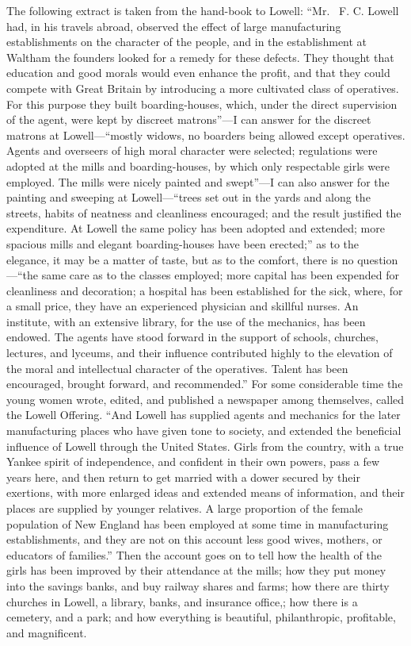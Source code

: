 The following extract is taken from the hand-book to Lowell: ``Mr.\ %
F. C. Lowell had, in his travels abroad, observed the effect of
large manufacturing establishments on the character of the people,
and in the establishment at Waltham the founders looked for a
remedy for these defects.  They thought that education and good
morals would even enhance the profit, and that they could compete
with Great Britain by introducing a more cultivated class of
operatives.  For this purpose they built boarding-houses, which,
under the direct supervision of the agent, were kept by discreet
matrons''---I can answer for the discreet matrons at Lowell---``mostly
widows, no boarders being allowed except operatives.  Agents and
overseers of high moral character were selected; regulations were
adopted at the mills and boarding-houses, by which only respectable
girls were employed.  The mills were nicely painted and swept''---I
can also answer for the painting and sweeping at Lowell---``trees set
out in the yards and along the streets, habits of neatness and
cleanliness encouraged; and the result justified the expenditure.
At Lowell the same policy has been adopted and extended; more
spacious mills and elegant boarding-houses have been erected;'' as
to the elegance, it may be a matter of taste, but as to the
comfort, there is no question---``the same care as to the classes
employed; more capital has been expended for cleanliness and
decoration; a hospital has been established for the sick, where,
for a small price, they have an experienced physician and skillful
nurses.  An institute, with an extensive library, for the use of
the mechanics, has been endowed.  The agents have stood forward in
the support of schools, churches, lectures, and lyceums, and their
influence contributed highly to the elevation of the moral and
intellectual character of the operatives.  Talent has been
encouraged, brought forward, and recommended.''  For some
considerable time the young women wrote, edited, and published a
newspaper among themselves, called the Lowell Offering.  ``And
Lowell has supplied agents and mechanics for the later
manufacturing places who have given tone to society, and extended
the beneficial influence of Lowell through the United States.
Girls from the country, with a true Yankee spirit of independence,
and confident in their own powers, pass a few years here, and then
return to get married with a dower secured by their exertions, with
more enlarged ideas and extended means of information, and their
places are supplied by younger relatives.  A large proportion of
the female population of New England has been employed at some time
in manufacturing establishments, and they are not on this account
less good wives, mothers, or educators of families.''  Then the
account goes on to tell how the health of the girls has been
improved by their attendance at the mills; how they put money into
the savings banks, and buy railway shares and farms; how there are
thirty churches in Lowell, a library, banks, and insurance office,;
how there is a cemetery, and a park; and how everything is
beautiful, philanthropic, profitable, and magnificent.

